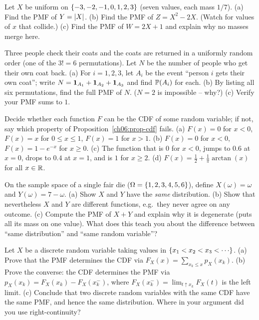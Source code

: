 \begin{exercise}
\label{ch06:ex-transform}
Let $X$ be uniform on $\set{-3,-2,-1,0,1,2,3}$ (seven values, each mass $1/7$).
(a) Find the PMF of $Y = \abs{X}$. (b) Find the PMF of $Z = X^2 - 2X$. (Watch for
values of $x$ that collide.) (c) Find the PMF of $W = 2X + 1$ and explain why no masses
merge here.
\end{exercise}

\begin{exercise}
\label{ch06:ex-fixed-points}
Three people check their coats and the coats are returned in a uniformly random order
(one of the $3! = 6$ permutations). Let $N$ be the number of people who get their own
coat back. (a) For $i = 1,2,3$, let $A_i$ be the event ``person $i$ gets their own
coat''; write $N = \ind_{A_1} + \ind_{A_2} + \ind_{A_3}$ and find $\P(A_i)$ for each.
(b) By listing all six permutations, find the full PMF of $N$. ($N = 2$ is
impossible -- why?) (c) Verify your PMF sums to $1$.
\end{exercise}

\begin{exercise}
\label{ch06:ex-cdf-concept}
Decide whether each function $F$ can be the CDF of some random variable; if not, say
which property of Proposition~\ref{ch06:prop-cdf} fails.
(a) $F(x) = 0$ for $x<0$, $F(x) = x$ for $0 \le x \le 1$, $F(x) = 1$ for $x > 1$.
(b) $F(x) = 0$ for $x < 0$, $F(x) = 1 - e^{-x}$ for $x \ge 0$.
(c) The function that is $0$ for $x<0$, jumps to $0.6$ at $x=0$, drops to $0.4$ at
$x=1$, and is $1$ for $x \ge 2$.
(d) $F(x) = \tfrac{1}{2} + \tfrac{1}{\pi}\arctan(x)$ for all $x \in \R$.
\end{exercise}

\begin{exercise}
\label{ch06:ex-same-dist-diff-fn}
On the sample space of a single fair die ($\Omega = \set{1,2,3,4,5,6}$), define
$X(\omega) = \omega$ and $Y(\omega) = 7 - \omega$. (a) Show $X$ and $Y$ have the
\emph{same} distribution. (b) Show that nevertheless $X$ and $Y$ are different
functions, e.g.\ they never agree on any outcome. (c) Compute the PMF of $X + Y$ and
explain why it is degenerate (puts all its mass on one value). What does this teach you
about the difference between ``same distribution'' and ``same random variable''?
\end{exercise}

\begin{exercise}
\label{ch06:ex-proof-cdf-pmf}
Let $X$ be a discrete random variable taking values in
$\set{x_1 < x_2 < x_3 < \cdots}$. (a) Prove that the PMF determines the CDF via
$F_X(x) = \sum_{x_k \le x} p_X(x_k)$. (b) Prove the converse: the CDF determines the
PMF via $p_X(x_k) = F_X(x_k) - F_X(x_{k}^-)$, where $F_X(x_k^-) = \lim_{t \uparrow x_k}
F_X(t)$ is the left limit. (c) Conclude that two discrete random variables with the
same CDF have the same PMF, and hence the same distribution. Where in your argument did
you use right-continuity?
\end{exercise}

